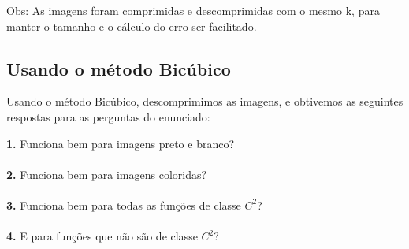 \documentclass[12pt,letterpaper]{article}
\begin{document}
	\begin{figure}[h]
	\end{figure}
	
	Obs: As imagens foram comprimidas e descomprimidas com o mesmo k, para manter o tamanho e o cálculo do erro ser facilitado.
	
	\subsection{Usando o método Bicúbico}

	Usando o método Bicúbico, descomprimimos as imagens, e obtivemos as seguintes respostas para as perguntas do enunciado:
	
	\textbf{1.} Funciona bem para imagens preto e branco?\\
	\\
	
	\textbf{2.} Funciona bem para imagens coloridas?\\
	\\
	
	\textbf{3.} Funciona bem para todas as funções de classe $C^2$?\\
	\\
	
	\textbf{4.} E para funções que não são de classe $C^2$? \\
	\\
	
\end{document}
